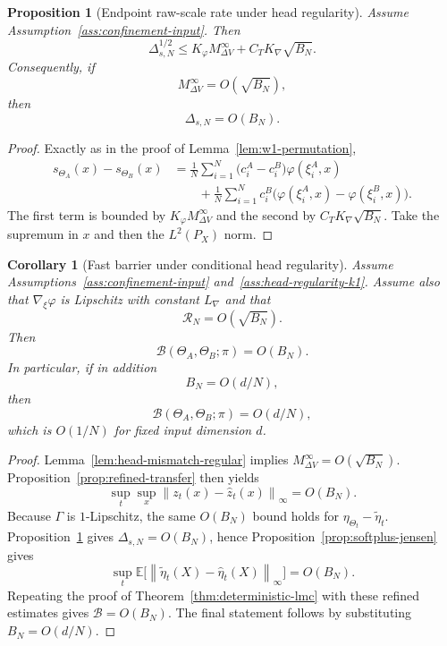 \documentclass[11pt]{article}
\newtheorem{proposition}[theorem]{Proposition}
\newtheorem{corollary}[theorem]{Corollary}
\theoremstyle{definition}
\newcommand{\E}{\mathbb{E}}
\newcommand{\norm}[1]{\left\lVert #1 \right\rVert}
\newcommand{\cB}{\mathcal{B}}
\begin{document}
\begin{proposition}[Endpoint raw-scale rate under head regularity]
\label{prop:scale-rate}
Assume Assumption~\ref{ass:confinement-input}. Then
\begin{equation}
  \Delta_{s,N}^{1/2}
  \le
  K_\varphi M_{\Delta V}^\infty + C_T K_{\nabla}\sqrt{B_N}.
  \label{eq:scale-rate}
\end{equation}
Consequently, if
\[
  M_{\Delta V}^\infty = O(\sqrt{B_N}),
\]
then
\[
  \Delta_{s,N} = O(B_N).
\]
\end{proposition}

\begin{proof}
Exactly as in the proof of Lemma~\ref{lem:w1-permutation},
\begin{align*}
  s_{\Theta_A}(x)-s_{\Theta_B}(x)
  &=
  \frac1N\sum_{i=1}^N
  \bigl(c_i^A-c_i^B\bigr)\varphi(\xi_i^A,x)
  \\
  &\qquad
  +
  \frac1N\sum_{i=1}^N
  c_i^B\bigl(\varphi(\xi_i^A,x)-\varphi(\xi_i^B,x)\bigr).
\end{align*}
The first term is bounded by
$K_\varphi M_{\Delta V}^\infty$ and the second by
$C_TK_{\nabla}\sqrt{B_N}$. Take the supremum in $x$ and then the
$L^2(P_X)$ norm.
\end{proof}

\begin{corollary}[Fast barrier under conditional head regularity]
\label{cor:fast-rate}
Assume Assumptions~\ref{ass:confinement-input}
and~\ref{ass:head-regularity-k1}. Assume also that
$\nabla_\xi\varphi$ is Lipschitz with constant $L_{\nabla}$ and that
\[
  \mathcal R_N = O(\sqrt{B_N}).
\]
Then
\[
  \cB(\Theta_A,\Theta_B;\pi)=O(B_N).
\]
In particular, if in addition
\[
  B_N = O(d/N),
\]
then
\[
  \cB(\Theta_A,\Theta_B;\pi)=O(d/N),
\]
which is $O(1/N)$ for fixed input dimension $d$.
\end{corollary}

\begin{proof}
Lemma~\ref{lem:head-mismatch-regular} implies
$M_{\Delta V}^\infty=O(\sqrt{B_N})$.
Proposition~\ref{prop:refined-transfer} then yields
\[
  \sup_t\sup_x \norm{z_t(x)-\hat z_t(x)}_\infty = O(B_N).
\]
Because $\Gamma$ is $1$-Lipschitz, the same $O(B_N)$ bound holds for
$\eta_{\Theta_t}-\tilde\eta_t$. Proposition~\ref{prop:scale-rate} gives
$\Delta_{s,N}=O(B_N)$, hence Proposition~\ref{prop:softplus-jensen} gives
\[
  \sup_t \E\big[\norm{\tilde\eta_t(X)-\hat\eta_t(X)}_\infty\big] = O(B_N).
\]
Repeating the proof of Theorem~\ref{thm:deterministic-lmc} with these refined
estimates gives $\cB=O(B_N)$. The final statement follows by substituting
$B_N=O(d/N)$.
\end{proof}
\end{document}

